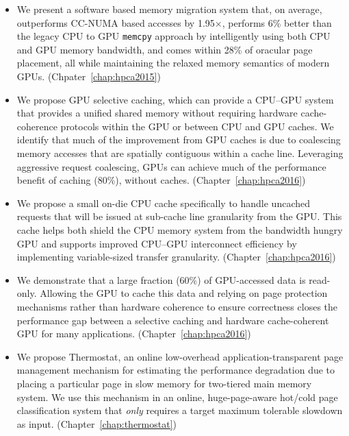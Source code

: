 \begin{itemize}

\item 
We present a software based memory migration system that, on average,
outperforms CC-NUMA based accesses by 1.95$\times$, performs 6\% better than the
legacy CPU to GPU {\tt memcpy} approach by intelligently using both CPU and GPU
memory bandwidth, and comes within 28\% of oracular page placement, all while
maintaining the relaxed memory semantics of modern GPUs.
(Chpater~\ref{chap:hpca2015})

\item
We propose GPU selective caching, which can provide a CPU--GPU system that
provides a unified shared memory without requiring hardware cache-coherence
protocols within the GPU or between CPU and GPU caches.
We identify that much of the improvement from GPU caches is due to coalescing 
memory accesses that are spatially contiguous within a cache line.  Leveraging
aggressive request coalescing, GPUs can achieve much of the performance benefit
of caching (80\%), without caches. (Chapter~\ref{chap:hpca2016})

\item
We propose a small on-die CPU cache specifically to handle uncached requests
that will be issued at sub-cache line granularity from the GPU. This cache helps
both shield the CPU memory system from the bandwidth hungry GPU and supports
improved CPU--GPU interconnect efficiency by implementing variable-sized
transfer granularity. (Chapter~\ref{chap:hpca2016})

\item
We demonstrate that a large fraction (60\%) of GPU-accessed data is read-only.
Allowing the GPU to cache this data and relying on page protection mechanisms
rather than hardware coherence to ensure correctness closes the performance gap
between a selective caching and hardware cache-coherent GPU for many
applications. (Chapter~\ref{chap:hpca2016})

\item
We propose Thermostat, an online low-overhead application-transparent page
management mechanism for estimating the performance degradation due to placing a
particular page in slow memory for two-tiered main memory system.  We use this
mechanism in an online, huge-page-aware hot/cold page classification system that
{\it only} requires a target maximum tolerable slowdown as input.
(Chapter~\ref{chap:thermostat})


\end{itemize}
